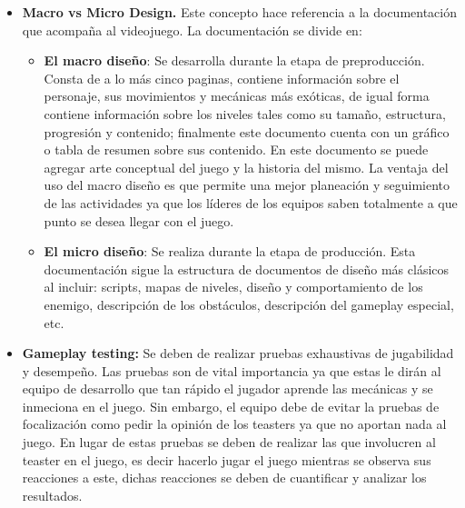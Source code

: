 \begin{itemize}
	 \item \textbf{ Macro vs Micro Design.}
Este concepto hace referencia a la documentación que acompaña al videojuego. 
La documentación se divide en:  
	\begin{itemize}
		\item \textbf{El macro diseño}: Se desarrolla durante la etapa de 
		preproducción. Consta de a lo más cinco paginas, contiene información 
		sobre el personaje, sus movimientos y mecánicas más exóticas, de igual 
		forma contiene información sobre los niveles tales como su tamaño, 
		estructura, progresión y contenido; finalmente este documento cuenta con un 
		gráfico o tabla de resumen sobre sus contenido. En este documento se puede 
		agregar arte conceptual del juego y la historia del mismo. La ventaja del uso 
		del macro diseño es que permite una mejor planeación y seguimiento de las 
		actividades ya que los líderes de los equipos saben totalmente a que punto se 
		desea llegar con el juego.
		\item \textbf{El micro diseño}: Se realiza durante la etapa de producción. Esta 
	documentación sigue la estructura de documentos de diseño más clásicos al incluir: 
	scripts, mapas de niveles, diseño y comportamiento de los enemigo, descripción de 
	los obstáculos, descripción del gameplay especial, etc.
	\end{itemize}
 
	\item \textbf{Gameplay testing:}
	Se deben de realizar pruebas exhaustivas de jugabilidad y desempeño. Las pruebas 
	son de vital importancia ya que estas le dirán al equipo de desarrollo que tan 
	rápido el jugador aprende las mecánicas y se inmeciona en el juego. Sin embargo, 
	el equipo debe de evitar la pruebas de focalización como pedir la opinión de 
	los teasters ya que no aportan nada al juego. En lugar de estas pruebas se deben 
	de realizar las que involucren al teaster en el juego, es decir hacerlo jugar 
	el juego mientras se observa sus reacciones a este, dichas reacciones se deben de 
	cuantificar y analizar los resultados.
 \end{itemize}


